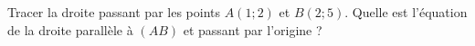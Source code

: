 
\begin{exercice}\label{exosmath-0616}

    Tracer la droite passant par les points \( A(1;2)\) et \( B(2;5)\). Quelle est l'équation de la droite parallèle à \( (AB)\) et passant par l'origine ?

\end{exercice}
